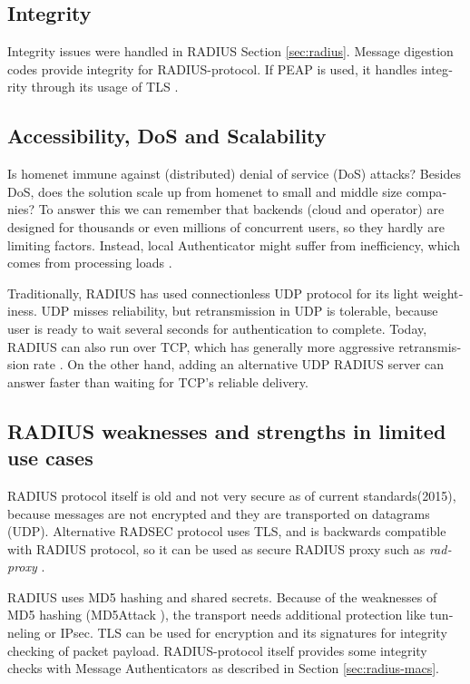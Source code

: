 \documentclass[12pt,a4paper,english]{tutthesis}
\begin{document}
\begin{otherlanguage}{english}
\subsection{Integrity}
\label{sec-6-5-2}
Integrity issues were handled in RADIUS Section \ref{sec:radius}.
Message digestion codes provide integrity for RADIUS-protocol.
If PEAP is used, it handles integrity through its usage of TLS
\cite{peap}.

\subsection{Accessibility, DoS and Scalability}
\label{sec-6-5-3}
Is homenet immune against (distributed) denial of service (DoS)
attacks? Besides DoS, does the solution scale up from homenet to
small and middle size companies?
To answer this we can remember that backends (cloud and operator) are
designed for thousands or even millions of concurrent users, so 
they hardly are limiting factors. Instead, local
Authenticator might suffer from inefficiency, which
comes from processing loads \cite{2009-lin-simefficiency}.


Traditionally, RADIUS has used connection\-less UDP protocol for its
light weightiness. UDP misses reliability, but retransmission in UDP is
tolerable, because user is ready to wait several seconds for
authentication to complete. Today, RADIUS can also run over TCP, which
has generally more aggressive retransmission
rate \cite[Section 2.2.1]{rfc5080}. 
On the other hand, adding an
alternative UDP RADIUS server can answer faster than waiting for TCP's reliable delivery.


\subsection{RADIUS weaknesses and strengths in limited use cases}
\label{sec-6-5-4}


RADIUS protocol itself is old and not very secure as of current
standards(2015), because messages are not encrypted and they are
transported on datagrams (UDP). Alternative RADSEC protocol uses TLS, and 
is backwards compatible with RADIUS protocol, so it can be used
as secure RADIUS proxy such as \emph{radproxy} \cite{uninett-radproxy}.

RADIUS uses MD5 hashing and shared secrets. Because of the weaknesses of
MD5 hashing (MD5Attack \cite{rfc5176}), the transport needs additional
protection like tunneling or IPsec. TLS can be used for encryption and
its signatures for integrity checking of packet payload.
RADIUS-protocol itself provides some integrity checks with Message
Authenticators as described in Section \ref{sec:radius-macs}.




\end{otherlanguage}
\end{document}
